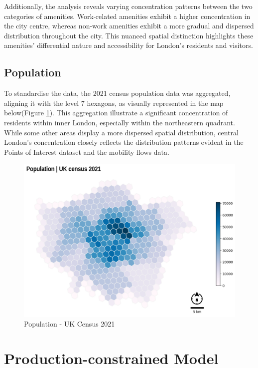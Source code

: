         Additionally, the analysis reveals varying concentration patterns between the two categories of amenities. Work-related amenities exhibit a higher concentration in the city centre, whereas non-work amenities exhibit a more gradual and dispersed distribution throughout the city. This nuanced spatial distinction highlights these amenities' differential nature and accessibility for London's residents and visitors.

        \subsection{Population}
 
        To standardise the data, the 2021 census population data was aggregated, aligning it with the level 7 hexagons, as visually represented in the map below(Figure \ref{fig: Population Census}). This aggregation illustrate a significant concentration of residents within inner London, especially within the northeastern quadrant. While some other areas display a more dispersed spatial distribution, central London's concentration closely reflects the distribution patterns evident in the Points of Interest dataset and the mobility flows data.
        
        \begin{figure}[H]
            \centering
            \includegraphics[width=12cm]{Images/population.png}
            \caption{Population - UK Census 2021}
            \label{fig: Population Census}
        \end{figure}

    \section{Production-constrained Model}    

